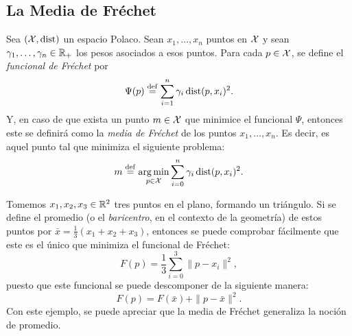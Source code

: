 {{{			\subsection*{La Media de Fréchet}\label{ssec:la-media-de-Frechet}
			{
				\begin{definition}
					Sea $(\mathcal{X}, \operatorname{dist})$ un espacio Polaco. Sean $x_1, \ldots, x_n$ puntos en $\mathcal{X}$ y sean $\gamma_1,\ldots,\gamma_n\in\mathbb{R}_+$ los pesos asociados a esos puntos. Para cada $p\in\mathcal{X}$, se define el \emph{funcional de Fréchet} por
					\begin{equation}
						\label{eq:funcionalFrechet}
						\Psi(p) \stackrel{\mathrm{def}}{=} \sum_{i=1}^{n} \gamma_i \operatorname{dist}(p, x_i)^2.
					\end{equation}
					Y, en caso de que exista un punto $m \in \mathcal{X}$ que minimice el funcional $\Psi$, entonces este se definirá como la \emph{media de Fréchet} de los puntos $x_1,\ldots, x_n$. Es decir, es aquel punto tal que minimiza el siguiente problema:
					\begin{equation}
						\label{eq:mediaFrechet}
						m \stackrel{\mathrm{def}}{=} \operatorname*{arg\,m{i}n}_{p \in \mathcal{X}} \sum_{i=0}^{n} \gamma_i \operatorname{dist}(p, x_i)^2.
					\end{equation}
				\end{definition}

				\begin{example}\label{ex:baricentro-triangulo}
					Tomemos $x_1, x_2, x_3 \in \mathbb{R}^2$ tres puntos en el plano, formando un triángulo. Si se define el promedio (o el \textit{baricentro}, en el contexto de la geometría) de estos puntos por $\bar x = \frac{1}{3} (x_1 + x_2 + x_3)$, entonces se puede comprobar fácilmente que este es el único que minimiza el funcional de Fréchet:
					\begin{equation}
						F(p) = \frac{1}{3} \sum_{i=0}^{3} \|p - x_i\|^2,
					\end{equation}
					puesto que este funcional se puede descomponer de la siguiente manera:
					\begin{equation}
						F(p) = F(\bar x) + \|p-\bar x\|^2.
					\end{equation}
					Con este ejemplo, se puede apreciar que la media de Fréchet generaliza la noción de promedio.
				\end{example}

}}}}
